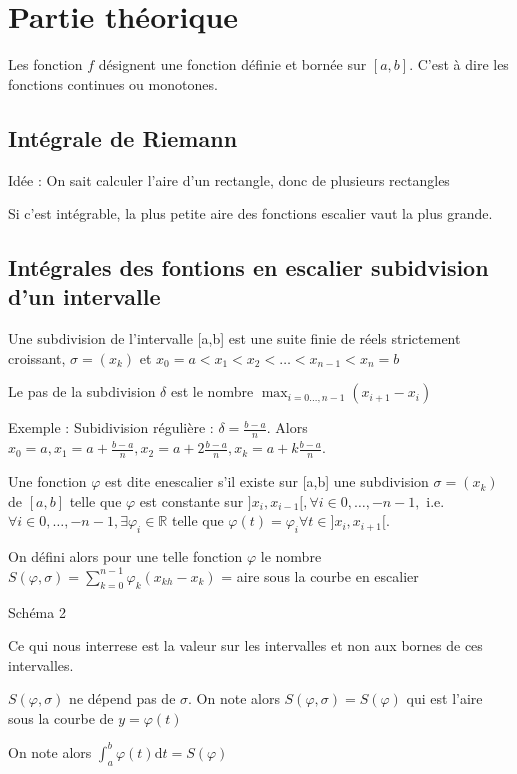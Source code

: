 \documentclass[french]{yLectureNote}
\begin{document}
\section{Partie théorique}
Les fonction $f$ désignent une fonction définie et bornée sur $[a,b]$. C'est à dire les fonctions continues ou monotones.
\subsection{Intégrale de Riemann}
Idée : On sait calculer l'aire d'un rectangle, donc de plusieurs rectangles

Si c'est intégrable, la plus petite aire des fonctions escalier vaut la plus grande.
\subsection{Intégrales des fontions en escalier subidvision d'un intervalle}
\begin{theorem}[Définition]
Une subdivision de l'intervalle [a,b] est une suite finie de réels strictement croissant, $\sigma = (x_k)$ et $x_0=a<x_1<x_2<\dots<x_{n-1}<x_n=b$

Le pas de la subdivision $\delta$ est le nombre $\max_{i=0\dots,n-1} (x_{i+1}-x_i)$
\end{theorem}


Exemple : Subidivision régulière : $\delta = \frac{b-a}{n}$. Alors $x_0 = a, x_1 = a+\frac{b-a}{n}, x_2 = a+2\frac{b-a}{n}, x_k = a+k\frac{b-a}{n}$.
\begin{theorem}
Une fonction $\varphi$ est dite enescalier s'il existe sur [a,b] une subdivision $\sigma=(x_k)$ de $[a,b]$ telle que $\varphi$ est constante sur $]x_i,x_{i-1}[, \forall i \in {0,\dots,-n-1},$ i.e. $\forall i\in {0,\dots,-n-1},\exists \varphi_i \in\mathbb{R}$ telle que $\varphi(t) = \varphi_i \forall t\in ]x_i,x_{i+1}[$.

On défini alors pour une telle fonction $\varphi$ le nombre $S(\varphi,\sigma) = \sum_{k=0}^{n-1} \varphi_k(x_{kh}-x_k)$ = aire sous la courbe en escalier

Schéma 2
\end{theorem}
Ce qui nous interrese est la valeur sur les intervalles et non aux bornes de ces intervalles.
\begin{theorem}[Proposition]
$S(\varphi,\sigma)$ ne dépend pas de $\sigma$. On note alors $S(\varphi,\sigma) = S(\varphi)$ qui est l'aire sous la courbe de $y=\varphi(t)$

On note alors $\int^b_a \varphi(t)\mathrm{d}t = S(\varphi)$
\end{theorem}
\end{document}
